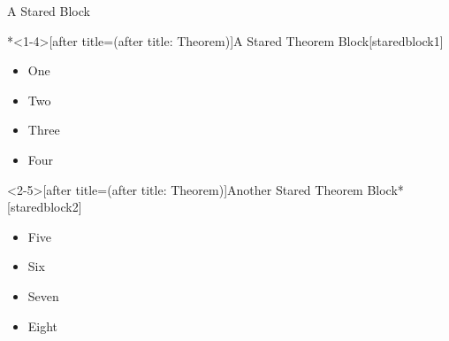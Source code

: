 \documentclass[hyperref, UTF8, CJK]{beamer}
\begin{document}
\begin{frame}{A Stared Block}
\begin{univtheorem}*<1-4>[after title=(after title: Theorem)]{A Stared Theorem Block}[staredblock1]
	\begin{itemize}[<+->]
		\item One
		\item Two~\only<2>{Two}
		\item \alert<3>{Three}
		\item Four
	\end{itemize}
\end{univtheorem}
\begin{univtheorem}<2-5>[after title=(after title: Theorem)]{Another Stared Theorem Block}*[staredblock2]
	\begin{itemize}
		\item Five
		\item Six~\only<3>{Six}
		\item \alert<3>{Seven}
		\item Eight
	\end{itemize}
\end{univtheorem}
\end{frame}
\end{document}

